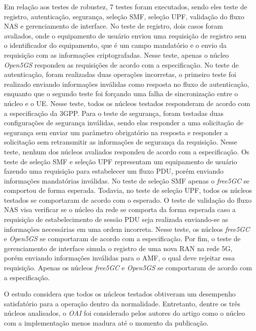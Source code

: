 Em relação aos testes de robustez, 7 testes foram executados, sendo eles teste de registro, autenticação, segurança, seleção SMF, seleção UPF, validação do fluxo NAS e gerenciamento de interface.
No teste de registro, dois casos foram avaliados, onde o equipamento de usuário enviou uma requisição de registro sem o identificador do equipamento, que é um campo mandatório e o envio da requisição com as informações criptografadas. Nesse teste, apenas o núcleo \textit{Open5GS} respondeu as requisições de acordo com a especificação.
No teste de autenticação, foram realizadas duas operações incorretas, o primeiro teste foi realizado enviando informações inválidas como resposta no fluxo de autenticação, enquanto que o segundo teste foi forçando uma falha de sincronização entre o núcleo e o UE. Nesse teste, todos os núcleos testados responderam de acordo com a especificação da 3GPP.
Para o teste de segurança, foram testadas duas configurações de segurança inválidas, sendo elas responder a uma solicitação de segurança sem enviar um parâmetro obrigatório na resposta e responder a solicitação sem retransmitir as informações de segurança da requisição. Nesse teste, nenhum dos núcleos avaliados respondeu de acordo com a especificação.
Os teste de seleção SMF e seleção UPF representam um equipamento de usuário fazendo uma requisição para estabelecer um fluxo PDU, porém enviando informações mandatórias inválidas. No teste de seleção SMF apenas o \textit{free5GC} se comportou de forma esperada. Todavia, no teste de seleção UPF, todos os núcleos testados se comportaram de acordo com o esperado.
O teste de validação do fluxo NAS visa verificar se o núcleo da rede se comporta da forma esperada caso a requisição de estabelecimento de sessão PDU seja realizada enviando-se as informações necessárias em uma ordem incorreta. Nesse teste, os núcleos \textit{free5GC} e \textit{Open5GS} se comportaram de acordo com a especificação.
Por fim, o teste de gerenciamento de interface simula o registro de uma nova RAN na rede 5G, porém enviando informações inválidas para o AMF, o qual deve rejeitar essa requisição. Apenas os núcleos \textit{free5GC} e \textit{Open5GS} se comportaram de acordo com a especificação.

O estudo considera que todos os núcleos testados obtiveram um desempenho satisfatório para a operação dentro da normalidade. Entretanto, dentre os três núcleos analisados, o \textit{OAI} foi considerado pelos autores do artigo como o núcleo com a implementação menos madura até o momento da publicação.

